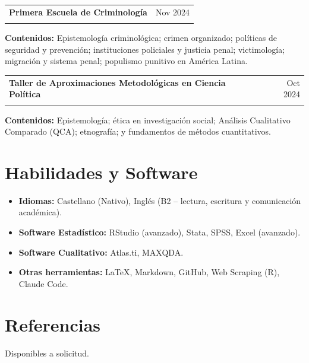 \documentclass[a4paper,10pt]{article}
\makeatletter
\newcommand{\experience}[5]{%
    \par\noindent\begin{minipage}{\linewidth}%
        \renewcommand{\arraystretch}{0.92}%
        \begin{tabularx}{\linewidth}{@{}>{\raggedright\arraybackslash}X@{\hspace{1em}}r@{}}%
            \textbf{#1} & {#2}\\
            {\itshape #3} & {\itshape #4}%
        \end{tabularx}\par
        #5%
    \end{minipage}\par\addvspace{2pt}%
}
\makeatother
\begin{document}
\experience{Primera Escuela de Criminología}{Nov 2024}{Centro de Estudios en Seguridad Ciudadana, Universidad de Chile}{}{
    \textbf{Contenidos:} Epistemología criminológica; crimen organizado; políticas de seguridad y prevención; instituciones policiales y justicia penal; victimología; migración y sistema penal; populismo punitivo en América Latina.
}

\experience{Taller de Aproximaciones Metodológicas en Ciencia Política}{Oct 2024}{Universidad Nacional Federico Villarreal}{}{
    \textbf{Contenidos:} Epistemología; ética en investigación social; Análisis Cualitativo Comparado (QCA); etnografía; y fundamentos de métodos cuantitativos.
}

\section*{Habilidades y Software}
\begin{itemize}[leftmargin=1.2em, itemsep=0pt, topsep=2pt, parsep=1pt]
    \item \textbf{Idiomas:} Castellano (Nativo), Inglés (B2 -- lectura, escritura y comunicación académica).
    \item \textbf{Software Estadístico:} RStudio (avanzado), Stata, SPSS, Excel (avanzado).
    \item \textbf{Software Cualitativo:} Atlas.ti, MAXQDA.
    \item \textbf{Otras herramientas:} \LaTeX, Markdown, GitHub, Web Scraping (R), Claude Code.
\end{itemize}

\section*{Referencias}
Disponibles a solicitud.
\end{document}
